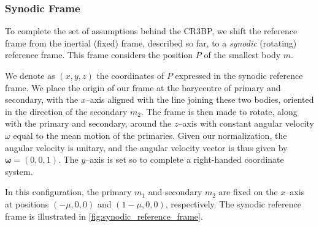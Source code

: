 \subsubsection{Synodic Frame} \label{subsubsec: synodic frame}
To complete the set of assumptions behind the CR3BP, we shift the reference frame from the inertial (fixed) frame, described so far, to a \emph{synodic} (rotating) reference frame. This frame considers the position $P$ of the smallest body $m$.

We denote as $(x,y,z)$ the coordinates of $P$ expressed in the synodic reference frame. We place the origin of our frame at the barycentre of primary and secondary, with the $x$--axis aligned with the line joining these two bodies, oriented in the direction of the secondary $m_2$. The frame is then made to rotate, along with the primary and secondary, around the $z$--axis with constant angular velocity $\omega$ equal to the mean motion of the primaries. Given our normalization, the angular velocity is unitary, and the angular velocity vector is thus given by $\boldsymbol{\omega} = (0,0,1)$. The $y$--axis is set so to complete a right-handed coordinate system.

In this configuration, the primary $m_1$ and secondary $m_2$ are fixed on the $x$--axis at positions $(-\mu, 0, 0)$ and $(1-\mu,0,0)$, respectively. The synodic reference frame is illustrated in \cref{fig:synodic_reference_frame}.

